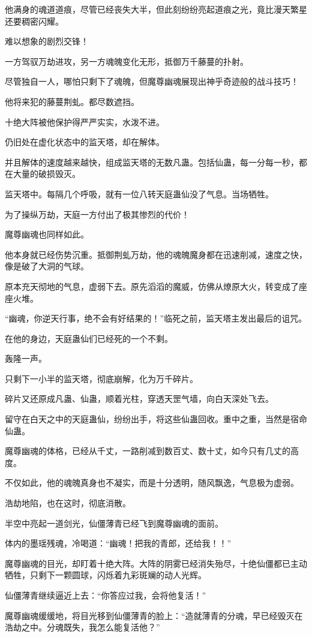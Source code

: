 \begin{this_body}
他满身的魂道道痕，尽管已经丧失大半，但此刻纷纷亮起道痕之光，竟比漫天繁星还要稠密闪耀。

难以想象的剧烈交锋！

一方驾驭万劫进攻，另一方魂魄变化无形，抵御万千藤蔓的扑射。

尽管独自一人，哪怕只剩下了魂魄，但魔尊幽魂展现出神乎奇迹般的战斗技巧！

他将来犯的藤蔓荆虬。都尽数遮挡。

十绝大阵被他保护得严严实实，水泼不进。

仍旧处在虚化状态中的监天塔，却在解体。

并且解体的速度越来越快，组成监天塔的无数凡蛊。包括仙蛊，每一分每一秒，都在大量的破损毁灭。

监天塔中。每隔几个呼吸，就有一位八转天庭蛊仙没了气息。当场牺牲。

为了操纵万劫，天庭一方付出了极其惨烈的代价！

魔尊幽魂也同样如此。

他本身就已经伤势沉重。抵御荆虬万劫，他的魂魄魔身都在迅速削减，速度之快，像是破了大洞的气球。

原本充天彻地的气息，虚弱下去。原先滔滔的魔威，仿佛从燎原大火，转变成了座座火堆。

“幽魂，你逆天行事，绝不会有好结果的！”临死之前，监天塔主发出最后的诅咒。

在他的身边，天庭蛊仙们已经死的一个不剩。

轰隆一声。

只剩下一小半的监天塔，彻底崩解，化为万千碎片。

碎片又还原成凡蛊、仙蛊，顺着光柱，穿透天罡气墙，向白天深处飞去。

留守在白天之中的天庭蛊仙，纷纷出手，将这些仙蛊回收。重中之重，当然是宿命仙蛊。

魔尊幽魂的体格，已经从千丈，一路削减到数百丈、数十丈，如今只有几丈的高度。

不仅如此，他的魂魄真身也不凝实，而是十分透明，随风飘逸，气息极为虚弱。

浩劫地陷，也在这时，彻底消散。

半空中亮起一道剑光，仙僵薄青已经飞到魔尊幽魂的面前。

体内的墨瑶残魂，冷喝道：“幽魂！把我的青郎，还给我！！”

魔尊幽魂的目光，却盯着十绝大阵。大阵的阴雾已经消失殆尽，十绝仙僵都已主动牺牲，只剩下一颗圆球，闪烁着九彩斑斓的动人光辉。

仙僵薄青继续逼近上去：“你答应过我，会将他复活！”

魔尊幽魂缓缓地，将目光移到仙僵薄青的脸上：“造就薄青的分魂，早已经毁灭在浩劫之中。分魂既失，我怎么能复活他？”


\end{this_body}
